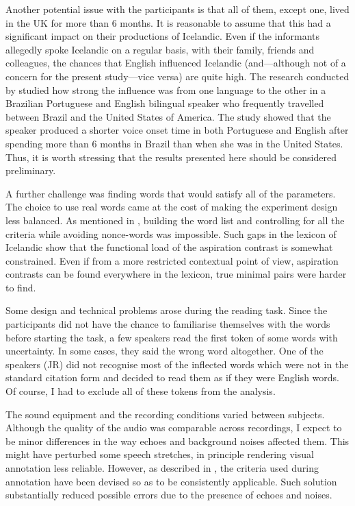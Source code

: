 \documentclass[11pt,a4paper,oneside,openany]{memoir}\usepackage[]{graphicx}\usepackage[]{color}
\begin{document}
Another potential issue with the participants is that all of them, except one, lived in the UK for more than 6 months.
It is reasonable to assume that this had a significant impact on their productions of Icelandic.
Even if the informants allegedly spoke Icelandic on a regular basis, with their family, friends and colleagues, the chances that English influenced Icelandic (and---although not of a concern for the present study---vice versa) are quite high.
The research conducted by \citet{sancier1997} studied how strong the influence was from one language to the other in a Brazilian Portuguese and English bilingual speaker who frequently travelled between Brazil and the United States of America.
The study showed that the speaker produced a shorter voice onset time in both Portuguese and English after spending more than 6 months in Brazil than when she was in the United States.
Thus, it is worth stressing that the results presented here should be considered preliminary.

A further challenge was finding words that would satisfy all of the parameters.
The choice to use real words came at the cost of making the experiment design less balanced.
As mentioned in , building the word list and controlling for all the criteria while avoiding nonce-words was impossible.
Such gaps in the lexicon of Icelandic show that the functional load of the aspiration contrast is somewhat constrained.
Even if from a more restricted contextual point of view, aspiration contrasts can be found everywhere in the lexicon, true minimal pairs were harder to find.

Some design and technical problems arose during the reading task.
Since the participants did not have the chance to familiarise themselves with the words before starting the task, a few speakers read the first token of some words with uncertainty.
In some cases, they said the wrong word altogether.
One of the speakers (JR) did not recognise most of the inflected words which were not in the standard citation form and decided to read them as if they were English words.
Of course, I had to exclude all of these tokens from the analysis.


The sound equipment and the recording conditions varied between subjects.
Although the quality of the audio was comparable across recordings, I expect to be minor differences in the way echoes and background noises affected them.
This might have perturbed some speech stretches, in principle rendering visual annotation less reliable.
However, as described in , the criteria used during annotation have been devised so as to be consistently applicable.
Such solution substantially reduced possible errors due to the presence of echoes and noises.
\end{document}
